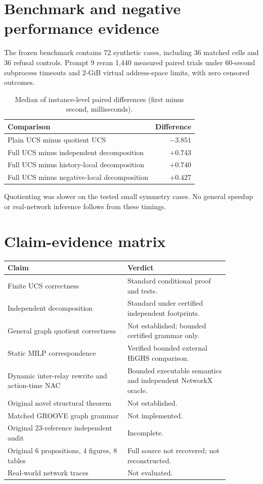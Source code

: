 \documentclass[10pt,a4paper]{article}
\begin{document}
\section{Benchmark and negative performance evidence}
The frozen benchmark contains 72 synthetic cases, including 36 matched cells and 36 refusal controls. Prompt 9 reran 1,440 measured paired trials under 60-second subprocess timeouts and 2-GiB virtual address-space limits, with zero censored outcomes.
\begin{table}[ht]\centering
\caption{Median of instance-level paired differences (first minus second, milliseconds).}
\begin{tabular}{lr}\toprule Comparison & Difference\\\midrule
Plain UCS minus quotient UCS & $-3.851$\\
Full UCS minus independent decomposition & $+0.743$\\
Full UCS minus history-local decomposition & $+0.740$\\
Full UCS minus negative-local decomposition & $+0.427$\\\bottomrule
\end{tabular}\end{table}
Quotienting was slower on the tested small symmetry cases. No general speedup or real-network inference follows from these timings.
\section{Claim-evidence matrix}
\begin{longtable}{p{0.47\linewidth}p{0.40\linewidth}}\toprule Claim & Verdict\\\midrule\endhead
Finite UCS correctness & Standard conditional proof and tests.\\
Independent decomposition & Standard under certified independent footprints.\\
General graph quotient correctness & Not established; bounded certified grammar only.\\
Static MILP correspondence & Verified bounded external HiGHS comparison.\\
Dynamic inter-relay rewrite and action-time NAC & Bounded executable semantics and independent NetworkX oracle.\\
Original novel structural theorem & Not established.\\
Matched GROOVE graph grammar & Not implemented.\\
Original 23-reference independent audit & Incomplete.\\
Original 6 propositions, 4 figures, 8 tables & Full source not recovered; not reconstructed.\\
Real-world network traces & Not evaluated.\\\bottomrule\end{longtable}
\end{document}
